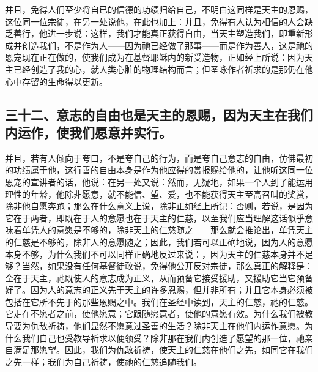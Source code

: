 并且，免得人们至少将自已的信德的功绩归给自己，不明白这同样是天主的恩赐，这位同一位宗徒，在另一处说他，在此也加上：并且，免得有人认为相信的人会缺乏善行，他进一步说：这样，我们才能真正获得自由，当天主塑造我们，即重新形成并创造我们，不是作为人——因为祂已经做了那事——而是作为善人，这是祂的恩宠现在正在做的，使我们成为在基督耶稣内的新受造物，正如经上所说：因为天主已经创造了我的心，就人类心脏的物理结构而言；但圣咏作者祈求的是那仍在他心中存留的生命得以更新。\par


\subsection{三十二、意志的自由也是天主的恩赐，因为天主在我们内运作，使我们愿意并实行。}

并且，若有人倾向于夸口，不是夸自己的行为，而是夸自己意志的自由，仿佛最初的功绩属于他，这行善的自由本身是作为他应得的赏报赐给他的，让他听这同一位恩宠的宣讲者的话，他说：在另一处又说：然而，无疑地，如果一个人到了能运用理性的年龄，他除非愿意，就不能信、望、爱，也不能获得天主至高召叫的奖赏，除非他自愿奔跑；那么在什么意义上说，除非正如经上所记：否则，若说，是因为它在于两者，即既在于人的意愿也在于天主的仁慈，以至我们应当理解这话似乎意味着单凭人的意愿是不够的，除非天主的仁慈随之——那么就会推论出，单凭天主的仁慈是不够的，除非人的意愿随之；因此，我们若可以正确地说，因为人的意愿本身不够，为什么我们不可以同样正确地反过来说：，因为天主的仁慈本身并不足够？当然，如果没有任何基督徒敢说，免得他公开反对宗徒，那么真正的解释是：全在于天主，祂既使人的意志成为正义，从而预备它接受援助，又援助它当它预备好了。因为人的意志的正义先于天主的许多恩赐，但并非所有；并且它本身必须被包括在它所不先于的那些恩赐之中。我们在圣经中读到，天主的仁慈，祂的仁慈。它走在不愿者之前，使他愿意；它跟随愿意者，使他的意愿有效。为什么我们被教导要为仇敌祈祷，他们显然不愿意过圣善的生活？除非天主在他们内运作意愿。为什么我们自己也受教导祈求以便领受？除非那在我们内创造了愿望的那一位，祂亲自满足那愿望。因此，我们为仇敌祈祷，使天主的仁慈在他们之先，如同它在我们之先一样；我们为自己祈祷，使祂的仁慈追随我们。\par


